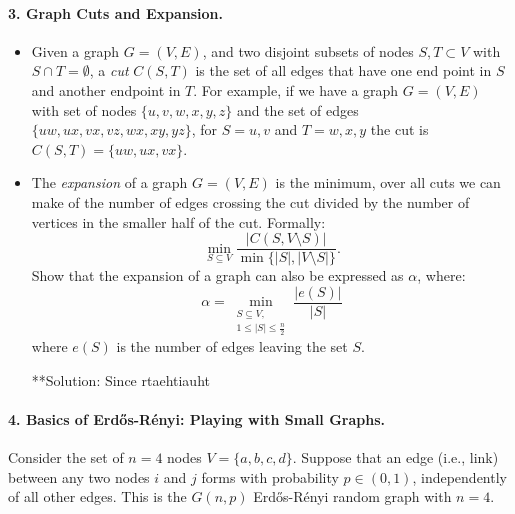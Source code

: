 \documentclass[11pt]{article}
\theoremstyle{definition} \newtheorem{Theorem}{theorem}
\begin{document}
\paragraph{3. Graph Cuts and Expansion.} 
\begin{itemize}
\item Given a graph $G=(V,E)$, and two disjoint subsets of nodes $S,T \subset V$ with $S \cap T = \emptyset$, a \emph{cut} $C(S,T)$ is the set of all edges that have one end point in $S$ and another endpoint in $T$.  For example, if we have a graph $G=(V,E)$ with set of nodes $\{u,v,w,x,y,z\}$ and the set of edges $\{uw, ux, vx, vz, wx, xy, yz \}$, for
$S = {u,v}$ and $T={w,x,y}$ the cut is $C(S,T) = \{uw,ux,vx\}$. 

\item The \emph{expansion} of a graph $G = (V,E)$ is the minimum, over all cuts we can make of the number of edges crossing the cut divided by the number of vertices in the smaller half of the cut. Formally:
 \[ \min_{S \subseteq V} \frac{|C(S,V\setminus S)|}{\min\{|S|,|V\setminus S|\}}.\]
%
Show that the expansion of a graph can also be expressed as $\alpha$, where:
 \[ \alpha = \min_{\substack{S \subseteq V, \\1 \leq |S| \leq \frac{n}{2} }} \frac{|e(S)|}{|S|} \]
where $e(S)$ is the number of edges leaving the set $S$.

**Solution: Since rtaehtiauht
\end{itemize}


\paragraph{4. Basics of Erd\H{o}s-R\'{e}nyi: Playing with Small Graphs.}

Consider the set of $n=4$ nodes $V=\{a,b,c,d\}$. Suppose that an edge (i.e., link) between any two nodes $i$ and $j$ forms with probability $p \in (0,1)$, independently of all other edges. This is the $G(n,p)$ Erd\H{o}s-R\'{e}nyi random graph with $n=4$.
\end{document}
